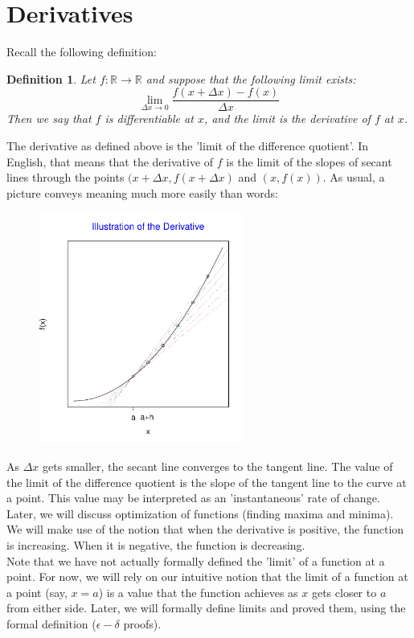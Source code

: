 \documentclass[12pt,a4paper]{article} %
\newtheorem{defn}{Definition}
\begin{document}
\section{Derivatives}
Recall the following definition:
\begin{defn}
Let $f:\mathbb{R}\rightarrow\mathbb{R}$ and suppose that the following limit exists:
$$\lim_{\Delta x\rightarrow 0} \frac{f(x+\Delta x) - f(x)}{\Delta x}$$
Then we say that $f$ is \emph{differentiable} at $x$, and the limit is the \emph{derivative of} $f$ \emph{at} $x$.
\end{defn}
The derivative as defined above is the 'limit of the difference quotient'.  In English, that means that the derivative of $f$ is the limit of the slopes of secant lines through the points $(x+\Delta x,f(x+\Delta x)$ and $(x,f(x))$.  As usual, a picture conveys meaning much more easily than words:
\begin{figure}[H]
\includegraphics[height=3in]{derivative.pdf}
\end{figure}
As $\Delta x$ gets smaller, the secant line converges to the tangent line.  The value of the limit of the difference quotient is the slope of the tangent line to the curve at a point.  This value may be interpreted as an 'instantaneous' rate of change.  Later, we will discuss optimization of functions (finding maxima and minima).  We will make use of the notion that when the derivative is positive, the function is increasing.  When it is negative, the function is decreasing.\\
Note that we have not actually formally defined the 'limit' of a function at a point. For now, we will rely on our intuitive notion that the limit of a function at a point (say, $x=a$) is a value that the function achieves as $x$ gets closer to $a$ from either side. Later, we will formally define limits and proved them, using the formal definition ($\epsilon-\delta$ proofs).\\
\end{document}
